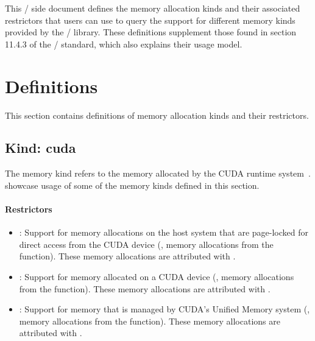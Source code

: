 This \mpi/ side document defines the memory allocation kinds and their
associated restrictors that users can use to query the support for
different memory kinds provided by the \mpi/ library. These definitions
supplement those found in section 11.4.3 of the \mpi/ standard, which
also explains their usage model.

\chapter{Definitions}
\label{chap:definitions}

This section contains definitions of memory allocation kinds and
their restrictors.

\section{Kind: cuda}

The  memory kind refers to the memory allocated by the
CUDA runtime system~\cite{cudaref}.
showcase usage of some of the memory kinds defined in this section.

\subsubsection{Restrictors}

\begin{itemize}

\item {}: Support for memory allocations on the host system
    that are page-locked for direct access from the CUDA device (\eg,
        memory allocations from the  function).
        These memory allocations are attributed with .

\item {}: Support for memory allocated on a CUDA device
    (\eg, memory allocations from the  function).
        These memory allocations are attributed with .

\item {}: Support for memory that is managed by CUDA’s
    Unified Memory system (\eg, memory allocations from the
         function).
        These memory allocations are attributed with .

\end{itemize}

